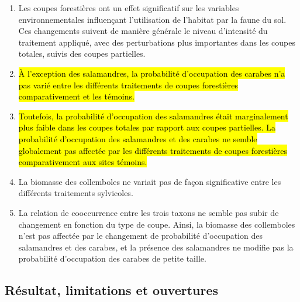 \begin{enumerate}
  \item Les coupes forestières ont un effet significatif sur les variables environnementales influençant l'utilisation de l'habitat par la faune du sol. Ces changements suivent de manière générale le niveau d'intensité du traitement appliqué, avec des perturbations plus importantes dans les coupes totales, suivis des coupes partielles.
  \item \hl{À l’exception des salamandres, la probabilité d’occupation des carabes n’a pas varié entre les différents traitements de coupes forestières comparativement et les témoins. }
  \item \hl{Toutefois, la probabilité d’occupation des salamandres était marginalement plus faible dans les coupes totales par rapport aux coupes partielles. La probabilité d’occupation des salamandres et des carabes ne semble globalement pas affectée par les différents traitements de coupes forestières comparativement aux sites témoins. }
  \item La biomasse des collemboles ne variait pas de façon significative entre les différents traitements sylvicoles.
  \item La relation de cooccurrence entre les trois taxons ne semble pas subir de changement en fonction du type de coupe. Ainsi, la biomasse des collemboles n'est pas affectée par le changement de probabilité d'occupation des salamandres et des carabes, et la présence des salamandres ne modifie pas la probabilité d'occupation des carabes de petite taille.
\end{enumerate}

\subsection{Résultat, limitations et ouvertures}

